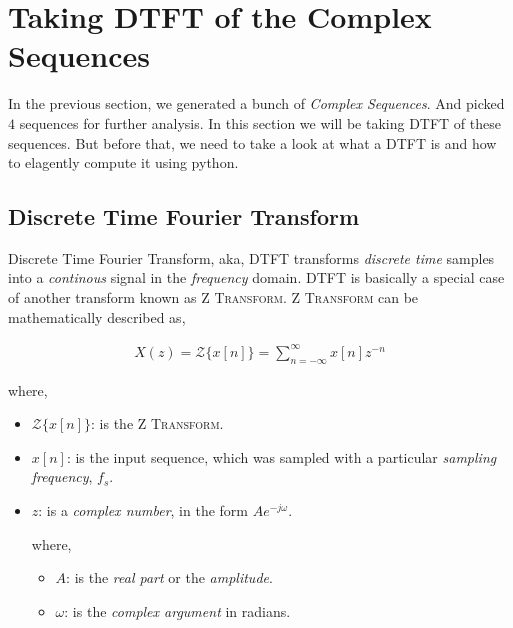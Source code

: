 \documentclass[../../course]{subfiles}
\begin{document}
\def\freqXOne{28}
\def\freqXTwo{28.1}
\def\freqXThree{56}

\section{Taking DTFT of the Complex Sequences} \label{sec:wrkTakingDTFTCplxSeqs}

In the previous section, we generated a bunch of \emph{Complex Sequences}. And
picked $4$ sequences for further analysis. In this section we will be taking
\textsc{DTFT} of these sequences. But before that, we need to take a look at what
a \textsc{DTFT} is and how to elagently compute it using python.

\subsection{Discrete Time Fourier Transform}

Discrete Time Fourier Transform, aka, \textsc{DTFT} transforms \emph{discrete time}
samples into a \emph{continous} signal in the \emph{frequency} domain. \textsc{DTFT}
is basically a special case of another transform known as \textsc{Z Transform}.
\textsc{Z Transform} can be mathematically described as,

\begin{align}
    X(z) = {\mathcal{Z}}\{x[n]\} = \sum_{n = - \infty}^{\infty} x[n] z^{-n}
\end{align}

where,

\begin{itemize} [label=]

    \item ${\mathcal{Z}}\{x[n]\}$: is the \textsc{Z Transform}.
    \item $x[n]$: is the input sequence, which was sampled with a
        particular \emph{sampling frequency}, $f_{s}$.
    \item $z$: is a \emph{complex number}, in the form $A e^{-j \omega}$.

        where,

        \begin{itemize} [label=]
            \item $A$: is the \emph{real part} or the \emph{amplitude}.
            \item $\omega$: is the \emph{complex argument} in radians.
        \end{itemize}

\end{itemize}
\end{document}
